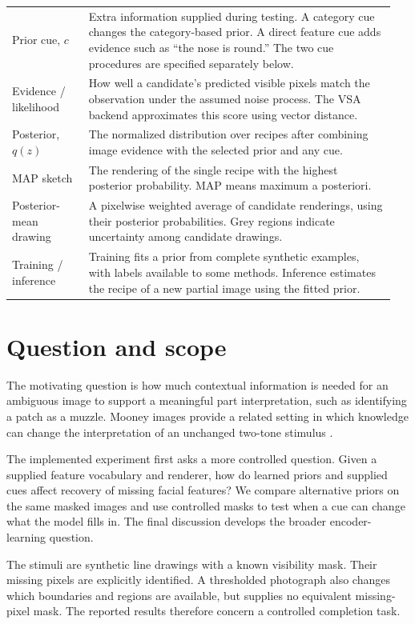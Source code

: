 \documentclass[11pt,letterpaper]{article}
\begin{document}
\begin{longtable}{@{}p{0.19\linewidth}p{0.76\linewidth}@{}}
Prior cue, $c$ & Extra information supplied during testing. A category cue changes the category-based prior. A direct feature cue adds evidence such as ``the nose is round.'' The two cue procedures are specified separately below. \\
Evidence / likelihood & How well a candidate's predicted visible pixels match the observation under the assumed noise process. The VSA backend approximates this score using vector distance. \\
Posterior, $q(z)$ & The normalized distribution over recipes after combining image evidence with the selected prior and any cue. \\
MAP sketch & The rendering of the single recipe with the highest posterior probability. MAP means maximum a posteriori. \\
Posterior-mean drawing & A pixelwise weighted average of candidate renderings, using their posterior probabilities. Grey regions indicate uncertainty among candidate drawings. \\
Training / inference & Training fits a prior from complete synthetic examples, with labels available to some methods. Inference estimates the recipe of a new partial image using the fitted prior. \\
\bottomrule
\end{longtable}
\addtocounter{table}{-1}

\section{Question and scope}
The motivating question is how much contextual information is needed for an ambiguous image to support a meaningful part interpretation, such as identifying a patch as a muzzle. Mooney images provide a related setting in which knowledge can change the interpretation of an unchanged two-tone stimulus \cite{schwiedrzik2018,lazarova2025}.

The implemented experiment first asks a more controlled question. Given a supplied feature vocabulary and renderer, how do learned priors and supplied cues affect recovery of missing facial features? We compare alternative priors on the same masked images and use controlled masks to test when a cue can change what the model fills in. The final discussion develops the broader encoder-learning question.

The stimuli are synthetic line drawings with a known visibility mask. Their missing pixels are explicitly identified. A thresholded photograph also changes which boundaries and regions are available, but supplies no equivalent missing-pixel mask. The reported results therefore concern a controlled completion task.
\end{document}
